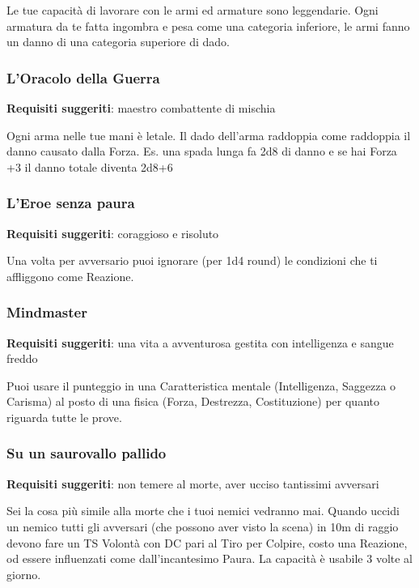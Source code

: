 \begin{multicols}{2}
Le tue capacità di lavorare con le armi ed armature sono leggendarie.
Ogni armatura da te fatta ingombra e pesa come una categoria inferiore, le armi fanno un danno di una categoria superiore di dado.

\subsubsection{L'Oracolo della Guerra}

\textbf{Requisiti suggeriti}: maestro combattente di mischia

Ogni arma nelle tue mani è letale. Il dado dell'arma raddoppia come raddoppia il danno causato dalla Forza. Es. una spada lunga fa 2d8 di danno e se hai Forza +3 il danno totale diventa 2d8+6

\subsubsection{L'Eroe senza paura}

\textbf{Requisiti suggeriti}: coraggioso e risoluto

Una volta per avversario puoi ignorare (per 1d4 round) le condizioni che ti affliggono come Reazione.

\subsubsection{Mindmaster}

\textbf{Requisiti suggeriti}: una vita a avventurosa gestita con intelligenza e sangue freddo

Puoi usare il punteggio in una Caratteristica mentale (Intelligenza, Saggezza o Carisma) al posto di una fisica (Forza, Destrezza, Costituzione) per quanto riguarda tutte le prove.

\subsubsection*{Su un saurovallo pallido}

\textbf{Requisiti suggeriti}: non temere al morte, aver ucciso tantissimi avversari

Sei la cosa più simile alla morte che i tuoi nemici vedranno mai.
Quando uccidi un nemico tutti gli avversari (che possono aver visto la scena) in 10m di raggio devono fare un TS Volontà con DC pari al Tiro per Colpire, costo una Reazione, od essere influenzati come dall'incantesimo Paura. La capacità è usabile 3 volte al giorno.


\end{multicols}
